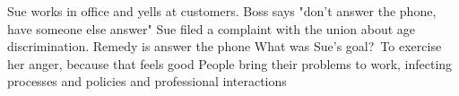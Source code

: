 Sue works in office and yells at customers. Boss says "don't answer the phone, have someone else answer"
Sue filed a complaint with the union about age discrimination. Remedy is answer the phone
What was Sue's goal? To exercise her anger, because that feels good
People bring their problems to work, infecting processes and policies and professional interactions 
